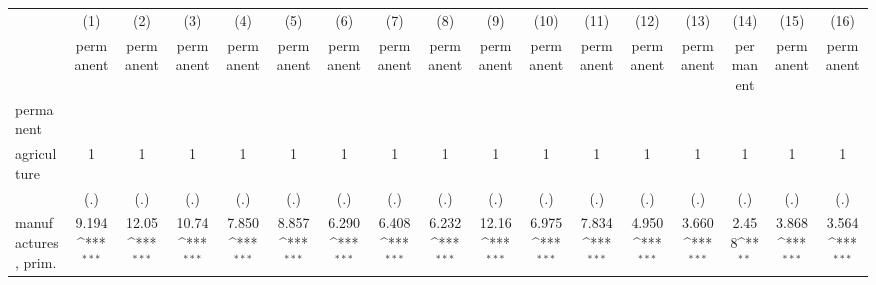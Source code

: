 {
\def\sym#1{\ifmmode^{#1}\else\(^{#1}\)\fi}
\begin{tabular}{l*{16}{c}}
\hline\hline
                    &\multicolumn{1}{c}{(1)}&\multicolumn{1}{c}{(2)}&\multicolumn{1}{c}{(3)}&\multicolumn{1}{c}{(4)}&\multicolumn{1}{c}{(5)}&\multicolumn{1}{c}{(6)}&\multicolumn{1}{c}{(7)}&\multicolumn{1}{c}{(8)}&\multicolumn{1}{c}{(9)}&\multicolumn{1}{c}{(10)}&\multicolumn{1}{c}{(11)}&\multicolumn{1}{c}{(12)}&\multicolumn{1}{c}{(13)}&\multicolumn{1}{c}{(14)}&\multicolumn{1}{c}{(15)}&\multicolumn{1}{c}{(16)}\\
                    &\multicolumn{1}{c}{permanent}&\multicolumn{1}{c}{permanent}&\multicolumn{1}{c}{permanent}&\multicolumn{1}{c}{permanent}&\multicolumn{1}{c}{permanent}&\multicolumn{1}{c}{permanent}&\multicolumn{1}{c}{permanent}&\multicolumn{1}{c}{permanent}&\multicolumn{1}{c}{permanent}&\multicolumn{1}{c}{permanent}&\multicolumn{1}{c}{permanent}&\multicolumn{1}{c}{permanent}&\multicolumn{1}{c}{permanent}&\multicolumn{1}{c}{permanent}&\multicolumn{1}{c}{permanent}&\multicolumn{1}{c}{permanent}\\
\hline
permanent           &                     &                     &                     &                     &                     &                     &                     &                     &                     &                     &                     &                     &                     &                     &                     &                     \\
agriculture         &           1         &           1         &           1         &           1         &           1         &           1         &           1         &           1         &           1         &           1         &           1         &           1         &           1         &           1         &           1         &           1         \\
                    &         (.)         &         (.)         &         (.)         &         (.)         &         (.)         &         (.)         &         (.)         &         (.)         &         (.)         &         (.)         &         (.)         &         (.)         &         (.)         &         (.)         &         (.)         &         (.)         \\
[1em]
manufactures, prim. &       9.194\sym{***}&       12.05\sym{***}&       10.74\sym{***}&       7.850\sym{***}&       8.857\sym{***}&       6.290\sym{***}&       6.408\sym{***}&       6.232\sym{***}&       12.16\sym{***}&       6.975\sym{***}&       7.834\sym{***}&       4.950\sym{***}&       3.660\sym{***}&       2.458\sym{**} &       3.868\sym{***}&       3.564\sym{***}\\

\end{tabular}}
